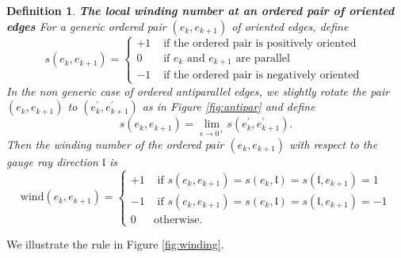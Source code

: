 \documentclass[11pt]{amsart}
\theoremstyle{plain}
\numberwithin{equation}{section}
\newtheorem{definition}{Definition}[subsection]
\begin{document}
\begin{figure}
\end{figure}

\begin{definition}\label{def:winding_pair}\textbf{The local winding number at an ordered pair of oriented edges}
For a generic ordered pair $(e_k,e_{k+1})$ of oriented edges, define
\begin{equation}\label{eq:def_s}
s(e_k,e_{k+1}) = \left\{
\begin{array}{ll}
+1 & \mbox{ if the ordered pair is positively oriented }  \\
0  & \mbox{ if } e_k \mbox{ and } e_{k+1} \mbox{ are parallel }\\
-1 & \mbox{ if the ordered pair is negatively oriented }
\end{array}
\right.
\end{equation}
In the non generic case of ordered antiparallel edges, we slightly rotate the pair $(e_k, e_{k+1})$ to $(e_k^{\prime}, e_{k+1}^{\prime})$ as in Figure \ref{fig:antipar} and define
\begin{equation}\label{eq:s_antipar}
s(e_k,e_{k+1}) = \lim_{\epsilon\to 0^+} s(e_k^{\prime},e_{k+1}^{\prime}).
\end{equation}
Then the winding number of the ordered pair $(e_k,e_{k+1})$ with respect to the gauge ray direction $\mathfrak{l}$ is
\begin{equation}\label{eq:def_wind}
\mbox{wind}(e_k,e_{k+1}) = \left\{
\begin{array}{ll}
+1 & \mbox{ if } s(e_k,e_{k+1}) = s(e_k,\mathfrak{l}) = s(\mathfrak{l},e_{k+1}) = 1\\
-1 & \mbox{ if } s(e_k,e_{k+1}) = s(e_k,\mathfrak{l}) = s(\mathfrak{l},e_{k+1}) = -1\\
0  & \mbox{otherwise}.
\end{array}
\right.
\end{equation}
\end{definition}
We illustrate the rule in Figure \ref{fig:winding}.
\end{document}

